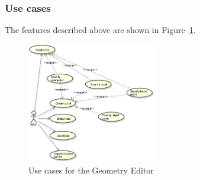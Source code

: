 \subsubsection{Use cases}

The features described above are shown in Figure~\ref{fig:use-cases-geometry-editor}.

\begin{figure}[hp]
\begin{center}
  \includegraphics[width=0.5\textwidth]{image/uc-geometry.png}
  \caption{Use cases for the Geometry Editor }
  \label{fig:use-cases-geometry-editor}
\end{center}
\end{figure}